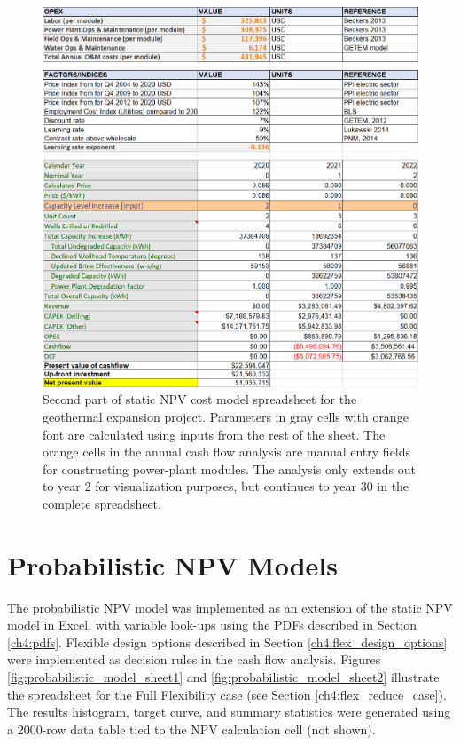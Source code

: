 \begin{figure}[H]
\centering
\includegraphics[width=\textwidth]{templates/images/Figure-Static_Model_SheetB.pdf}
\caption[Static cost model spreadsheet (part 2)]{Second part of static NPV cost model spreadsheet for the geothermal expansion project. Parameters in gray cells with orange font are calculated using inputs from the rest of the sheet. The orange cells in the annual cash flow analysis are manual entry fields for constructing power-plant modules. The analysis only extends out to year 2 for visualization purposes, but continues to year 30 in the complete spreadsheet.}
\label{fig:static_model_sheet2}
\end{figure}

\section{Probabilistic NPV Models}\label{app:B_flex_models}
The probabilistic NPV model was implemented as an extension of the static NPV model in Excel, with variable look-ups using the PDFs described in Section \ref{ch4:pdfs}. Flexible design options described in Section \ref{ch4:flex_design_options} were implemented as decision rules in the cash flow analysis. Figures \ref{fig:probabilistic_model_sheet1} and \ref{fig:probabilistic_model_sheet2} illustrate the spreadsheet for the Full Flexibility case (see Section \ref{ch4:flex_reduce_case}). The results histogram, target curve, and summary statistics were generated using a 2000-row data table tied to the NPV calculation cell (not shown).

